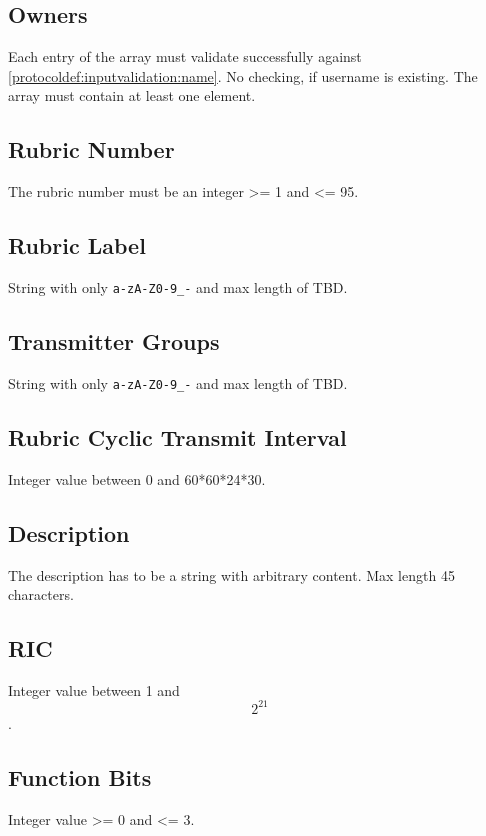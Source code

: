 \subsection{Owners}
\label{protocoldef:inputvalidation:owners}
Each entry of the array must validate successfully against \ref{protocoldef:inputvalidation:name}. No checking, if username is existing. The array must contain at least one element.

\subsection{Rubric Number}
\label{protocoldef:inputvalidation:rubricnumber}
The rubric number must be an integer >= 1 and <= 95.

\subsection{Rubric Label}
\label{protocoldef:inputvalidation:rubriclabel}
String with only \verb|a-zA-Z0-9_-| and max length of TBD.

\subsection{Transmitter Groups}
\label{protocoldef:inputvalidation:transmittergroup}
String with only \verb|a-zA-Z0-9_-| and max length of TBD.

\subsection{Rubric Cyclic Transmit Interval}
\label{protocoldef:inputvalidation:cyclictransmitinterval}
Integer value between 0 and 60*60*24*30.

\subsection{Description}
\label{protocoldef:inputvalidation:description}
The description has to be a string with arbitrary content. Max length 45 characters.

\subsection{RIC}
\label{protocoldef:inputvalidation:ric}
Integer value between 1 and $$2^21$$.

\subsection{Function Bits}
\label{protocoldef:inputvalidation:function}
Integer value >= 0 and <= 3.

